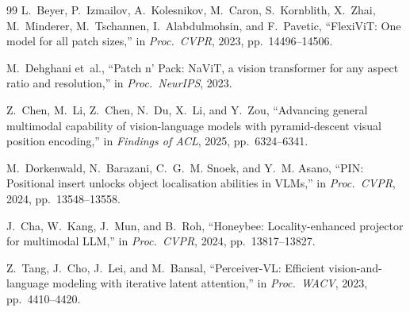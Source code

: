 \documentclass{article}
\begin{document}
{\begin{thebibliography}{99}
L.~Beyer, P.~Izmailov, A.~Kolesnikov, M.~Caron, S.~Kornblith,
X.~Zhai, M.~Minderer, M.~Tschannen, I.~Alabdulmohsin, and
F.~Pavetic,
``FlexiViT: One model for all patch sizes,''
in \emph{Proc.\ CVPR}, 2023, pp.~14496--14506.

M.~Dehghani et~al.,
``Patch n' Pack: NaViT, a vision transformer for any aspect
ratio and resolution,''
in \emph{Proc.\ NeurIPS}, 2023.

Z.~Chen, M.~Li, Z.~Chen, N.~Du, X.~Li, and Y.~Zou,
``Advancing general multimodal capability of vision-language
models with pyramid-descent visual position encoding,''
in \emph{Findings of ACL}, 2025, pp.~6324--6341.

M.~Dorkenwald, N.~Barazani, C.~G.~M. Snoek, and Y.~M. Asano,
``PIN: Positional insert unlocks object localisation abilities
in VLMs,''
in \emph{Proc.\ CVPR}, 2024, pp.~13548--13558.

J.~Cha, W.~Kang, J.~Mun, and B.~Roh,
``Honeybee: Locality-enhanced projector for multimodal LLM,''
in \emph{Proc.\ CVPR}, 2024, pp.~13817--13827.

Z.~Tang, J.~Cho, J.~Lei, and M.~Bansal,
``Perceiver-VL: Efficient vision-and-language modeling with
iterative latent attention,''
in \emph{Proc.\ WACV}, 2023, pp.~4410--4420.

\end{thebibliography}
}
\end{document}
